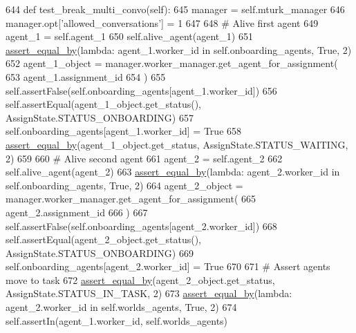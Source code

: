 \begin{DoxyCode}
644     \textcolor{keyword}{def }test\_break\_multi\_convo(self):
645         manager = self.mturk\_manager
646         manager.opt[\textcolor{stringliteral}{'allowed\_conversations'}] = 1
647 
648         \textcolor{comment}{# Alive first agent}
649         agent\_1 = self.agent\_1
650         self.alive\_agent(agent\_1)
651         \hyperlink{namespaceparlai_1_1mturk_1_1core_1_1test_1_1test__full__system_a0b463246d35658a2e422010f13dcf819}{assert\_equal\_by}(\textcolor{keyword}{lambda}: agent\_1.worker\_id \textcolor{keywordflow}{in} self.onboarding\_agents, \textcolor{keyword}{True}, 2)
652         agent\_1\_object = manager.worker\_manager.get\_agent\_for\_assignment(
653             agent\_1.assignment\_id
654         )
655         self.assertFalse(self.onboarding\_agents[agent\_1.worker\_id])
656         self.assertEqual(agent\_1\_object.get\_status(), AssignState.STATUS\_ONBOARDING)
657         self.onboarding\_agents[agent\_1.worker\_id] = \textcolor{keyword}{True}
658         \hyperlink{namespaceparlai_1_1mturk_1_1core_1_1test_1_1test__full__system_a0b463246d35658a2e422010f13dcf819}{assert\_equal\_by}(agent\_1\_object.get\_status, AssignState.STATUS\_WAITING, 2)
659 
660         \textcolor{comment}{# Alive second agent}
661         agent\_2 = self.agent\_2
662         self.alive\_agent(agent\_2)
663         \hyperlink{namespaceparlai_1_1mturk_1_1core_1_1test_1_1test__full__system_a0b463246d35658a2e422010f13dcf819}{assert\_equal\_by}(\textcolor{keyword}{lambda}: agent\_2.worker\_id \textcolor{keywordflow}{in} self.onboarding\_agents, \textcolor{keyword}{True}, 2)
664         agent\_2\_object = manager.worker\_manager.get\_agent\_for\_assignment(
665             agent\_2.assignment\_id
666         )
667         self.assertFalse(self.onboarding\_agents[agent\_2.worker\_id])
668         self.assertEqual(agent\_2\_object.get\_status(), AssignState.STATUS\_ONBOARDING)
669         self.onboarding\_agents[agent\_2.worker\_id] = \textcolor{keyword}{True}
670 
671         \textcolor{comment}{# Assert agents move to task}
672         \hyperlink{namespaceparlai_1_1mturk_1_1core_1_1test_1_1test__full__system_a0b463246d35658a2e422010f13dcf819}{assert\_equal\_by}(agent\_2\_object.get\_status, AssignState.STATUS\_IN\_TASK, 2)
673         \hyperlink{namespaceparlai_1_1mturk_1_1core_1_1test_1_1test__full__system_a0b463246d35658a2e422010f13dcf819}{assert\_equal\_by}(\textcolor{keyword}{lambda}: agent\_2.worker\_id \textcolor{keywordflow}{in} self.worlds\_agents, \textcolor{keyword}{True}, 2)
674         self.assertIn(agent\_1.worker\_id, self.worlds\_agents)

\end{DoxyCode}

